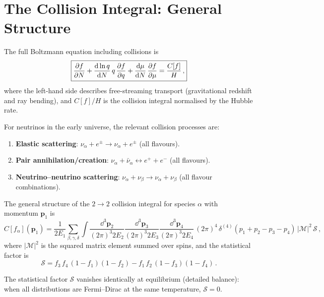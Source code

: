 \section{The Collision Integral: General Structure}\label{sec:collision_integral}

The full Boltzmann equation including collisions is
\begin{equation}
\boxed{\frac{\partial f}{\partial N} + \frac{\mathrm{d}\ln q}{\mathrm{d} N}\,q\,\frac{\partial f}{\partial q} + \frac{\mathrm{d}\mu}{\mathrm{d} N}\,\frac{\partial f}{\partial \mu} = \frac{C[f]}{H}\,,}\label{eq:boltzmann_full}
\end{equation}
where the left-hand side describes free-streaming transport (gravitational redshift and ray bending), and $C[f]/H$ is the collision integral normalised by the Hubble rate.

For neutrinos in the early universe, the relevant collision processes are:

\begin{enumerate}
\item \textbf{Elastic scattering}: $\nu_\alpha + e^\pm \to \nu_\alpha + e^\pm$ (all flavours).
\item \textbf{Pair annihilation/creation}: $\nu_\alpha + \bar\nu_\alpha \leftrightarrow e^+ + e^-$ (all flavours).
\item \textbf{Neutrino--neutrino scattering}: $\nu_\alpha + \nu_\beta \to \nu_\alpha + \nu_\beta$ (all flavour combinations).
\end{enumerate}

The general structure of the $2 \to 2$ collision integral for species $\alpha$ with momentum $\mathbf{p}_1$ is
\begin{equation}
C[f_\alpha](\mathbf{p}_1) = \frac{1}{2E_1}\sum_{\beta,\gamma,\delta}\int \frac{\dd^3\mathbf{p}_2}{(2\pi)^3 2E_2}\frac{\dd^3\mathbf{p}_3}{(2\pi)^3 2E_3}\frac{\dd^3\mathbf{p}_4}{(2\pi)^3 2E_4}\,(2\pi)^4\,\delta^{(4)}(p_1+p_2-p_3-p_4)\,|\mathcal{M}|^2\,\mathcal{S}\,,\label{eq:coll_general}
\end{equation}
where $|\mathcal{M}|^2$ is the squared matrix element summed over spins, and the statistical factor is
\begin{equation}
\mathcal{S} = f_3\,f_4\,(1-f_1)(1-f_2) - f_1\,f_2\,(1-f_3)(1-f_4)\,.
\end{equation}

The statistical factor $\mathcal{S}$ vanishes identically at equilibrium (detailed balance): when all distributions are Fermi--Dirac at the same temperature, $\mathcal{S} = 0$.

